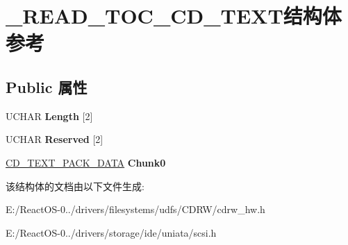 \hypertarget{struct___r_e_a_d___t_o_c___c_d___t_e_x_t}{}\section{\+\_\+\+R\+E\+A\+D\+\_\+\+T\+O\+C\+\_\+\+C\+D\+\_\+\+T\+E\+X\+T结构体 参考}
\label{struct___r_e_a_d___t_o_c___c_d___t_e_x_t}
\subsection*{Public 属性}
\begin{DoxyCompactItemize}
\item 
\mbox{\label{struct___r_e_a_d___t_o_c___c_d___t_e_x_t_a6d1c487318057075127d8083f622c7b7}} 
U\+C\+H\+AR {\bfseries Length} \mbox{[}2\mbox{]}
\item 
\mbox{\label{struct___r_e_a_d___t_o_c___c_d___t_e_x_t_ad132bb9017b741d450cec70f437fe318}} 
U\+C\+H\+AR {\bfseries Reserved} \mbox{[}2\mbox{]}
\item 
\mbox{\label{struct___r_e_a_d___t_o_c___c_d___t_e_x_t_a9cf3003b95a99beca95ad5539241194d}} 
\hyperlink{struct___c_d___t_e_x_t___p_a_c_k___d_a_t_a}{C\+D\+\_\+\+T\+E\+X\+T\+\_\+\+P\+A\+C\+K\+\_\+\+D\+A\+TA} {\bfseries Chunk0}
\end{DoxyCompactItemize}


该结构体的文档由以下文件生成\+:\begin{DoxyCompactItemize}
\item 
E\+:/\+React\+O\+S-\/0../drivers/filesystems/udfs/\+C\+D\+R\+W/cdrw\+\_\+hw.\+h\item 
E\+:/\+React\+O\+S-\/0../drivers/storage/ide/uniata/scsi.\+h\end{DoxyCompactItemize}
